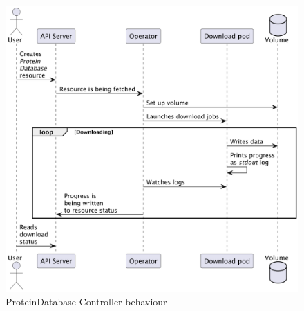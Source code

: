 \begin{figure}[htbp]
    \centering
    \includegraphics[width=\textwidth]{images/proteindatabase_controller}
    \caption{ProteinDatabase Controller behaviour}
    \label{fig:proteindatabase_controller}
\end{figure}

